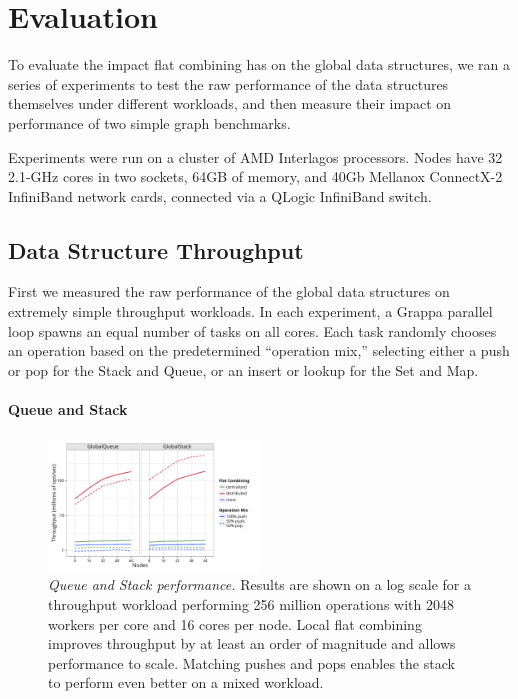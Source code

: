 \section{Evaluation}
To evaluate the impact flat combining has on the global data structures, we ran a series of experiments to test the raw performance of the data structures themselves under different workloads, and then measure their impact on performance of two simple graph benchmarks.

Experiments were run on a cluster of AMD Interlagos processors. Nodes have 32 2.1-GHz cores in two sockets, 64GB of memory, and 40Gb Mellanox ConnectX-2 InfiniBand network cards, connected via a QLogic InfiniBand switch.

\subsection{Data Structure Throughput}
First we measured the raw performance of the global data structures on extremely simple throughput workloads. In each experiment, a Grappa parallel loop spawns an equal number of tasks on all cores. Each task randomly chooses an operation based on the predetermined ``operation mix,'' selecting either a push or pop for the Stack and Queue, or an insert or lookup for the Set and Map.

\paragraph{Queue and Stack}
\begin{figure}[t]
  \centering
  \includegraphics[width=0.5\textwidth]{data/plots/vector_perf.pdf}
  \caption{\emph{Queue and Stack performance.}
    Results are shown on a log scale for a throughput workload performing 256 million operations with 2048 workers per core and 16 cores per node. Local flat combining improves throughput by at least an order of magnitude and allows performance to scale. Matching pushes and pops enables the stack to perform even better on a mixed workload.
  }
  \label{fig:vector}
\end{figure}

